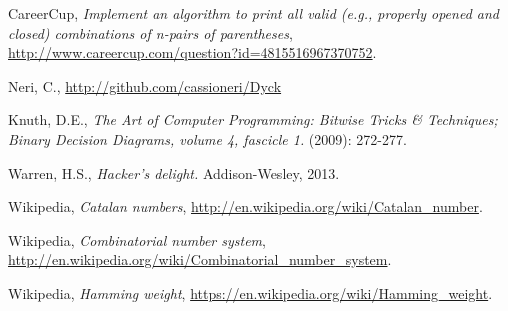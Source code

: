 \documentclass[a4paper]{article}
\begin{document}
\begin{thebibliography}{99}

 CareerCup, {\em Implement an algorithm to print all valid (e.g., properly opened and closed) combinations of n-pairs of parentheses},
\url{http://www.careercup.com/question?id=4815516967370752}.

 Neri, C., \url{http://github.com/cassioneri/Dyck}

 Knuth, D.E., {\em The Art of Computer Programming: Bitwise Tricks \& Techniques; Binary Decision Diagrams, volume 4, fascicle 1.} (2009): 272-277.

 Warren, H.S., {\em Hacker's delight.} Addison-Wesley, 2013.

 Wikipedia, {\em Catalan numbers},
\url{http://en.wikipedia.org/wiki/Catalan_number}.

 Wikipedia, {\em Combinatorial number system},
\url{http://en.wikipedia.org/wiki/Combinatorial_number_system}.

 Wikipedia, {\em Hamming weight},
\url{https://en.wikipedia.org/wiki/Hamming_weight}.



\end{thebibliography}
\end{document}
